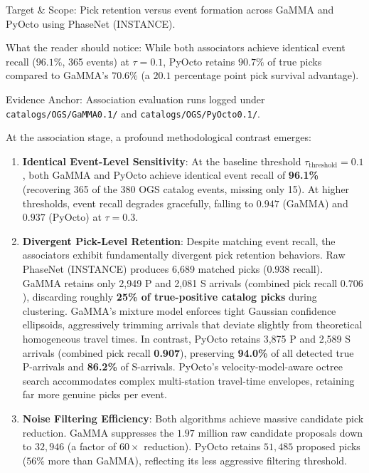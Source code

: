 \begin{table}[htbp]
\begin{threeparttable}
\begin{tablenotes}[flushleft]
      \item Target \& Scope: Pick retention versus event formation across GaMMA and PyOcto using PhaseNet (INSTANCE).
      \item What the reader should notice: While both associators achieve identical event recall ($96.1\%$, 365 events) at $\tau=0.1$, PyOcto retains $90.7\%$ of true picks compared to GaMMA's $70.6\%$ (a $20.1$ percentage point pick survival advantage).
      \item Evidence Anchor: Association evaluation runs logged under \texttt{catalogs/OGS/GaMMA0.1/} and \texttt{catalogs/OGS/PyOcto0.1/}.
    \end{tablenotes}
  \end{threeparttable}
\end{table}

At the association stage, a profound methodological contrast emerges:
\begin{enumerate}
  \item \textbf{Identical Event-Level Sensitivity}: At the baseline threshold $\tau_{\mathrm{threshold}} = 0.1$, both GaMMA and PyOcto achieve identical event recall of \textbf{96.1\%} (recovering 365 of the 380 OGS catalog events, missing only 15). At higher thresholds, event recall degrades gracefully, falling to $0.947$ (GaMMA) and $0.937$ (PyOcto) at $\tau=0.3$.
  \item \textbf{Divergent Pick-Level Retention}: Despite matching event recall, the associators exhibit fundamentally divergent pick retention behaviors. Raw PhaseNet (INSTANCE) produces 6,689 matched picks ($0.938$ recall). GaMMA retains only 2,949 P and 2,081 S arrivals (combined pick recall $0.706$), discarding roughly \textbf{25\% of true-positive catalog picks} during clustering. GaMMA's mixture model enforces tight Gaussian confidence ellipsoids, aggressively trimming arrivals that deviate slightly from theoretical homogeneous travel times. In contrast, PyOcto retains 3,875 P and 2,589 S arrivals (combined pick recall \textbf{0.907}), preserving \textbf{94.0\%} of all detected true P-arrivals and \textbf{86.2\%} of S-arrivals. PyOcto's velocity-model-aware octree search accommodates complex multi-station travel-time envelopes, retaining far more genuine picks per event.
  \item \textbf{Noise Filtering Efficiency}: Both algorithms achieve massive candidate pick reduction. GaMMA suppresses the $1.97$ million raw candidate proposals down to $32{,}946$ (a factor of $60\times$ reduction). PyOcto retains $51{,}485$ proposed picks ($56\%$ more than GaMMA), reflecting its less aggressive filtering threshold.
\end{enumerate}

